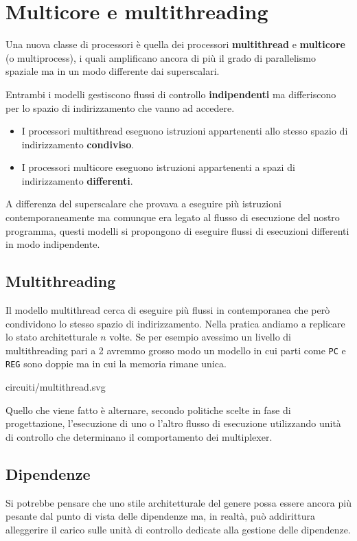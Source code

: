 \section{Multicore e multithreading}
Una nuova classe di processori è quella dei processori \textbf{multithread} e \textbf{multicore}
(o multiprocess), i quali amplificano ancora di più il grado di parallelismo spaziale ma in un modo
differente dai superscalari.

Entrambi i modelli gestiscono flussi di controllo \textbf{indipendenti} ma differiscono per lo
spazio di indirizzamento che vanno ad accedere.
\begin{itemize}
	\item I processori multithread eseguono istruzioni appartenenti allo stesso spazio di
	      indirizzamento \textbf{condiviso}.
	\item I processori multicore eseguono istruzioni appartenenti a spazi di indirizzamento
	      \textbf{differenti}.
\end{itemize}
A differenza del superscalare che provava a eseguire più istruzioni contemporaneamente ma comunque
era legato al flusso di esecuzione del nostro programma, questi modelli si propongono di eseguire
flussi di esecuzioni differenti in modo indipendente.

\subsection{Multithreading}
Il modello multithread cerca di eseguire più flussi in contemporanea che però condividono lo stesso
spazio di indirizzamento. Nella pratica andiamo a replicare lo stato architetturale $n$ volte. Se
per esempio avessimo un livello di multithreading pari a 2 avremmo grosso modo un modello in cui
parti come \verb|PC| e \verb|REG| sono doppie ma in cui la memoria rimane unica.
\begin{center}
	 {circuiti/multithread.svg}
\end{center}
Quello che viene fatto è alternare, secondo politiche scelte in fase di progettazione, l'esecuzione
di uno o l'altro flusso di esecuzione utilizzando unità di controllo che determinano il
comportamento dei multiplexer.

\subsection{Dipendenze}
Si potrebbe pensare che uno stile architetturale del genere possa essere ancora più pesante dal
punto di vista delle dipendenze ma, in realtà, può addirittura alleggerire il carico sulle unità di
controllo dedicate alla gestione delle dipendenze.

